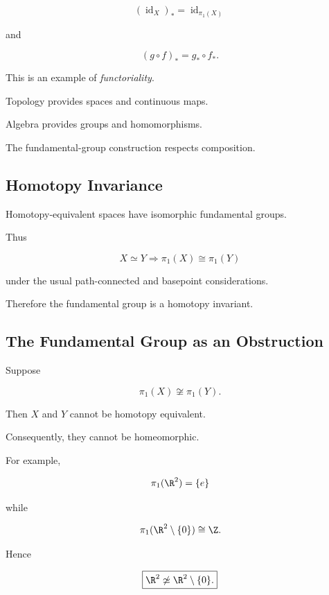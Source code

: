\[
\boxed{
(\operatorname{id}_X)_*
=
\operatorname{id}_{\pi_1(X)}
}
\]

and

\[
\boxed{
(g\circ f)_*
=
g_*\circ f_*.
}
\]

This is an example of \emph{functoriality}.

Topology provides spaces and continuous maps.

Algebra provides groups and homomorphisms.

The fundamental-group construction respects composition.

\subsection{Homotopy Invariance}
\label{subsec:fundamental-group-homotopy-invariance}

Homotopy-equivalent spaces have isomorphic fundamental groups.

Thus

\[
\boxed{
X\simeq Y
\Longrightarrow
\pi_1(X)\cong\pi_1(Y)
}
\]

under the usual path-connected and basepoint considerations.

Therefore the fundamental group is a homotopy invariant.

\subsection{The Fundamental Group as an Obstruction}
\label{subsec:fundamental-group-obstruction}

Suppose

\[
\pi_1(X)\not\cong\pi_1(Y).
\]

Then \(X\) and \(Y\) cannot be homotopy equivalent.

Consequently, they cannot be homeomorphic.

For example,

\[
\pi_1(\R^2)=\{e\}
\]

while

\[
\pi_1(\R^2\setminus\{0\})\cong\Z.
\]

Hence

\[
\boxed{
\R^2
\not\simeq
\R^2\setminus\{0\}.
}
\]


